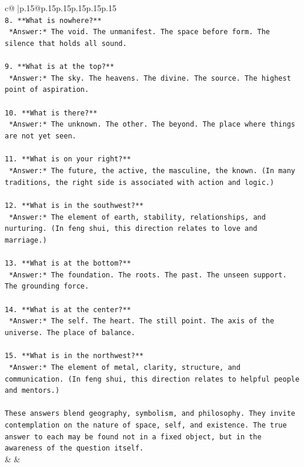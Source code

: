\documentclass{article}
\begin{document}
{\begin{supertabular}{c@{$\;$}|p{.15\linewidth}@{}p{.15\linewidth}p{.15\linewidth}p{.15\linewidth}p{.15\linewidth}p{.15\linewidth}}
{{{\\ 
\texttt{8. **What is nowhere?**  } \\
\texttt{   *Answer:* The void. The unmanifest. The space before form. The silence that holds all sound.} \\
\\ 
\texttt{9. **What is at the top?**  } \\
\texttt{   *Answer:* The sky. The heavens. The divine. The source. The highest point of aspiration.} \\
\\ 
\texttt{10. **What is there?**  } \\
\texttt{   *Answer:* The unknown. The other. The beyond. The place where things are not yet seen.} \\
\\ 
\texttt{11. **What is on your right?**  } \\
\texttt{   *Answer:* The future, the active, the masculine, the known. (In many traditions, the right side is associated with action and logic.)} \\
\\ 
\texttt{12. **What is in the southwest?**  } \\
\texttt{   *Answer:* The element of earth, stability, relationships, and nurturing. (In feng shui, this direction relates to love and marriage.)} \\
\\ 
\texttt{13. **What is at the bottom?**  } \\
\texttt{   *Answer:* The foundation. The roots. The past. The unseen support. The grounding force.} \\
\\ 
\texttt{14. **What is at the center?**  } \\
\texttt{   *Answer:* The self. The heart. The still point. The axis of the universe. The place of balance.} \\
\\ 
\texttt{15. **What is in the northwest?**  } \\
\texttt{   *Answer:* The element of metal, clarity, structure, and communication. (In feng shui, this direction relates to helpful people and mentors.)} \\
\\ 
\texttt{These answers blend geography, symbolism, and philosophy. They invite contemplation on the nature of space, self, and existence. The true answer to each may be found not in a fixed object, but in the awareness of the question itself.} \\
            }
        }
    }
    & & \\ \\


\end{supertabular}}
\end{document}
